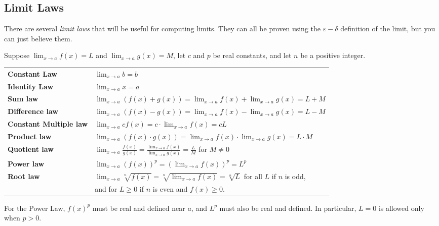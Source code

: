 \subsection{Limit Laws}

There are several \textit{limit laws} that will be useful for computing limits. They can all be proven using the $\varepsilon-\delta$ definition of the limit, but you can just believe them.

Suppose $\displaystyle\lim _{x \to a} f(x)=L$ and $\displaystyle\lim _{x \to a} g(x)=M$, let $c$ and $p$ be real constants, and let $n$ be a positive integer.

\begin{center}
\def\arraystretch{2}
\begin{tabular}{@{}ll@{}}
\toprule[0.4mm]
\textbf{Constant Law} & $\displaystyle \lim_{x\to a} b= b$\\
\textbf{Identity Law} & $\displaystyle\lim_{x\to a}x = a$\\
\textbf{Sum law} & $\displaystyle\lim _{x \rightarrow a}(f(x)+g(x))=\lim _{x \rightarrow a} f(x)+\lim _{x \rightarrow a} g(x)=L+M$ \\
\textbf{Difference law} & $\displaystyle\lim _{x \rightarrow a}(f(x)-g(x))=\lim _{x \rightarrow a} f(x)-\lim _{x \rightarrow a} g(x)=L-M$ \\
\textbf{Constant Multiple law} & $\displaystyle\lim _{x \rightarrow a} c f(x)=c \cdot \lim _{x \rightarrow a} f(x)=c L$ \\
\textbf{Product law} & $\displaystyle\lim _{x \rightarrow a}(f(x) \cdot g(x))=\lim _{x \rightarrow a} f(x) \cdot \lim _{x \rightarrow a} g(x)=L \cdot M$ \\
\textbf{Quotient law} & $\displaystyle\lim _{x \rightarrow a} \frac{f(x)}{g(x)}=\frac{\displaystyle\lim _{x \rightarrow a} f(x)}{\displaystyle\lim _{x \rightarrow a} g(x)}=\frac{L}{M}$ for $M \neq 0$ \\
\textbf{Power law} & $\displaystyle\lim _{x \rightarrow a}(f(x))^{p}=\left(\lim _{x \rightarrow a} f(x)\right)^{p}=L^{p}$\\
\textbf{Root law} & $\displaystyle\lim _{x \rightarrow a} \sqrt[n]{f(x)}=\sqrt[n]{\lim _{x \rightarrow a} f(x)}=\sqrt[n]{L}$ for all $L$ if $n$ is odd,\\
& and for $L \geq 0$ if $n$ is even and $f(x) \geq 0 .$ \\
\bottomrule[0.4mm]
\end{tabular}
\end{center}
For the Power Law, $f(x)^p$ must be real and defined near $a$, and
$L^p$ must also be real and defined. In particular, $L=0$ is allowed
only when $p>0$.


